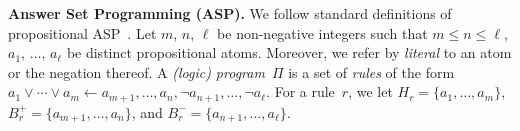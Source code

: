 \documentclass{article}
\begin{document}
\smallskip
\noindent\textbf{Answer Set Programming (ASP).} %
%
We follow standard definitions of propositional ASP~\cite{BrewkaEiterTruszczynski11}.
%
Let $m$, $n$, $\ell$ be non-negative integers such that
$m \leq n \leq \ell$, $a_1$, $\ldots$, $a_\ell$ be distinct propositional
atoms. Moreover, we refer by \emph{literal} to an atom or the negation
thereof.
%
A \emph{(logic) program}~$\Pi$ is a set of \emph{rules} of the form
%
\(
a_1\vee \cdots \vee a_m \leftarrow a_{m+1}, \ldots, a_{n}, \neg
a_{n+1}, \ldots, \neg a_\ell.
%
\)
%
%
%
%
%
%
%
%
%
For a rule~$r$, we let $H_r = \{a_1, \ldots, a_m\}$,
$B^+_r = \{a_{m+1}, \ldots, a_{n}\}$, and
$B^-_r = \{a_{n+1}, \ldots, a_\ell\}$.
%
\end{document}
